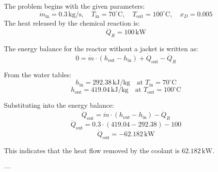 The problem begins with the given parameters:  
\[
\dot{m}_{\text{in}} = 0.3 \, \text{kg/s}, \quad T_{\text{in}} = 70^\circ\text{C}, \quad T_{\text{out}} = 100^\circ\text{C}, \quad x_D = 0.005
\]  
The heat released by the chemical reaction is:  
\[
\dot{Q}_R = 100 \, \text{kW}
\]  

The energy balance for the reactor without a jacket is written as:  
\[
0 = \dot{m} \cdot (h_{\text{out}} - h_{\text{in}}) + \dot{Q}_{\text{out}} - \dot{Q}_R
\]  

From the water tables:  
\[
h_{\text{in}} = 292.38 \, \text{kJ/kg} \quad \text{at } T_{\text{in}} = 70^\circ\text{C}
\]  
\[
h_{\text{out}} = 419.04 \, \text{kJ/kg} \quad \text{at } T_{\text{out}} = 100^\circ\text{C}
\]  

Substituting into the energy balance:  
\[
\dot{Q}_{\text{out}} = \dot{m} \cdot (h_{\text{out}} - h_{\text{in}}) - \dot{Q}_R
\]  
\[
\dot{Q}_{\text{out}} = 0.3 \cdot (419.04 - 292.38) - 100
\]  
\[
\dot{Q}_{\text{out}} = -62.182 \, \text{kW}
\]  

This indicates that the heat flow removed by the coolant is \( 62.182 \, \text{kW} \).  

---